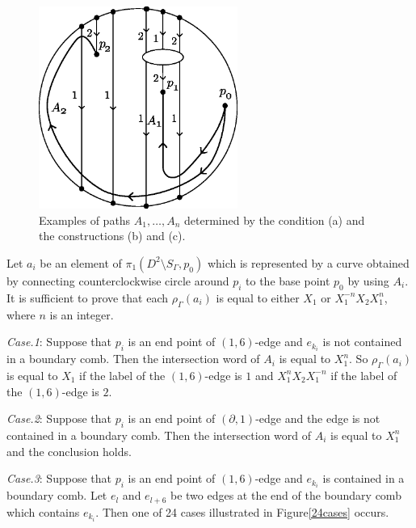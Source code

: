 \documentclass{amsart}
\theoremstyle{plain}
\theoremstyle{definition}
\begin{document}
\begin{figure}[htbp]
\begin{center}
\includegraphics[width=65mm]{ex_path.eps}
\end{center}
\caption{Examples of paths $A_1,\ldots,A_n$ determined by the condition (a) and the constructions (b) and (c). }
\label{ex_path}
\end{figure}

Let $a_i$ be an element of $\pi_1(D^2\setminus S_\Gamma,p_0)$ 
which is represented by a curve obtained by connecting counterclockwise circle around $p_i$ to the base point $p_0$ by using $A_i$. 
It is sufficient to prove that each $\rho_\Gamma(a_i)$ is equal to either $X_1$ or $X_1^{-n}X_2X_1^n$, where $n$ is an integer. 

\par

{\it Case.1}: Suppose that $p_i$ is an end point of $(1,6)$-edge and $e_{k_{i}}$ is not contained in a boundary comb. 
Then the intersection word of $A_i$ is equal to $X_1^{n}$. 
So $\rho_\Gamma(a_i)$ is equal to $X_1$ if the label of the $(1,6)$-edge is $1$ and $X_1^nX_2X_1^{-n}$ if the label of the $(1,6)$-edge is $2$. 

\par

{\it Case.2}: Suppose that $p_i$ is an end point of $(\partial,1)$-edge and the edge is not contained in a boundary comb. 
Then the intersection word of $A_i$ is equal to $X_1^n$ and the conclusion holds. 

\par

{\it Case.3}: Suppose that $p_i$ is an end point of $(1,6)$-edge and $e_{k_i}$ is contained in a boundary comb. 
Let $e_l$ and $e_{l+6}$ be two edges at the end of the boundary comb which contains $e_{k_i}$. 
Then one of 24 cases illustrated in Figure\ref{24cases} occurs. 
\end{document}
